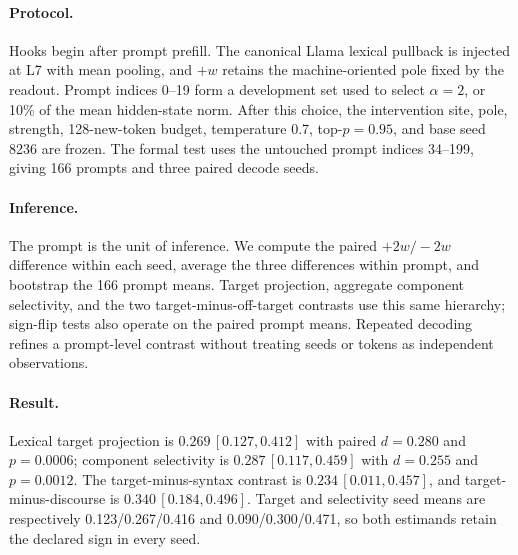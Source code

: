\paragraph{Protocol.} Hooks begin after prompt prefill. The canonical Llama lexical pullback is injected at L7 with mean pooling, and \(+w\) retains the machine-oriented pole fixed by the readout. Prompt indices 0--19 form a development set used to select \(\alpha=2\), or 10\% of the mean hidden-state norm. After this choice, the intervention site, pole, strength, 128-new-token budget, temperature 0.7, top-\(p=0.95\), and base seed 8236 are frozen. The formal test uses the untouched prompt indices 34--199, giving 166 prompts and three paired decode seeds.

\paragraph{Inference.} The prompt is the unit of inference. We compute the paired \(+2w/-2w\) difference within each seed, average the three differences within prompt, and bootstrap the 166 prompt means. Target projection, aggregate component selectivity, and the two target-minus-off-target contrasts use this same hierarchy; sign-flip tests also operate on the paired prompt means. Repeated decoding refines a prompt-level contrast without treating seeds or tokens as independent observations.

\paragraph{Result.} Lexical target projection is \(0.269\,[0.127,0.412]\) with paired \(d=0.280\) and \(p=0.0006\); component selectivity is \(0.287\,[0.117,0.459]\) with \(d=0.255\) and \(p=0.0012\). The target-minus-syntax contrast is \(0.234\,[0.011,0.457]\), and target-minus-discourse is \(0.340\,[0.184,0.496]\). Target and selectivity seed means are respectively 0.123/0.267/0.416 and 0.090/0.300/0.471, so both estimands retain the declared sign in every seed.

